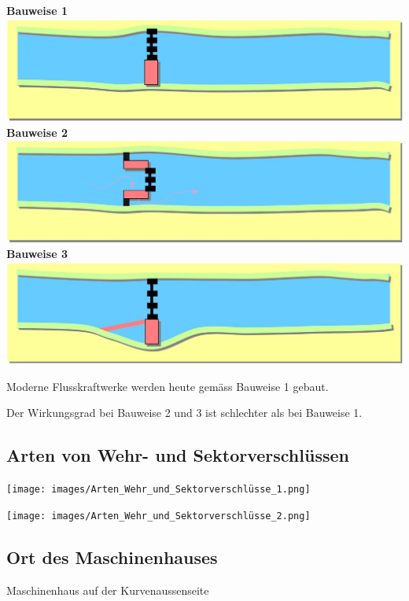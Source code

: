 \textbf{Bauweise 1}\\
\includegraphics[width=0.98\columnwidth, align=c]{images/Flusskraftwerke_Bauweise_1.jpg}
\vspace{0.15cm}
\textbf{Bauweise 2}\\
\includegraphics[width=0.98\columnwidth, align=c]{images/Flusskraftwerke_Bauweise_2.jpg}
\vspace{0.15cm}
\textbf{Bauweise 3}\\
\includegraphics[width=0.98\columnwidth, align=c]{images/Flusskraftwerke_Bauweise_3.jpg}
\vspace{0.15cm}

Moderne Flusskraftwerke werden heute gemäss Bauweise 1 gebaut.

Der Wirkungsgrad bei Bauweise 2 und 3 ist schlechter als bei Bauweise 1.


\subsection{Arten von Wehr- und Sektorverschlüssen}
\texttt{[image: images/Arten\_Wehr\_und\_Sektorverschlüsse\_1.png]}

\texttt{[image: images/Arten\_Wehr\_und\_Sektorverschlüsse\_2.png]}



\subsection{Ort des Maschinenhauses}
Maschinenhaus auf der Kurvenaussenseite

